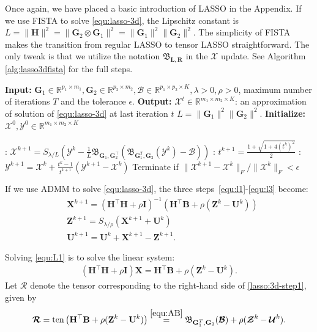 \documentclass[10pt]{article}  	%
\theoremstyle{definition}
\theoremstyle{definition}
\newcommand{\R}{{\mathbb{R}}}
\newcommand{\Bc}{\boldsymbol{{\mathcal{B}}}}
\newcommand{\Xc}{ \boldsymbol{{\mathcal{X}}}}
\newcommand{\Yc}{\boldsymbol{{\mathcal{Y}}}}
\DeclareMathOperator*{\mat}{{\rm{mat}}}
\DeclareMathOperator*{\ten}{{\rm{ten}}}
\newcommand{\mB}{\mathbf{B}}
\newcommand{\mG}{\mathbf{G}}
\newcommand{\mH}{\mathbf{H}}
\newcommand{\mI}{\mathbf{I}}
\newcommand{\mL}{\mathbf{L}}
\newcommand{\mR}{\mathbf{R}}
\newcommand{\mU}{\mathbf{U}}
\newcommand{\mX}{\mathbf{X}}
\newcommand{\mZ}{\mathbf{Z}}
\theoremstyle{remark}
\begin{document}
Once again, we have placed a basic introduction of LASSO in the Appendix.
If we use FISTA to solve \eqref{equ:lasso-3d}, the Lipschitz constant is   $L=\|\mH\|^2=\|\mG_2 \otimes \mG_1\|^2=\|\mG_1\|^2\|\mG_2\|^2$. The simplicity of FISTA makes the transition from regular LASSO to tensor LASSO straightforward. The only tweak is that we utilize the notation $\mathfrak{B}_{\mL, \mR}$ in the $\Xc$ update.
See Algorithm \ref{alg:lasso3dfista} for the full steps.
\begin{algorithm}[htb]
\caption{LASSO($\mG_1, \mG_2, \Bc, \lambda; T, \epsilon$): FISTA}\label{alg:lasso3dfista}
\begin{algorithmic}
\State\textbf{Input:} $\mG_1 \in \R^{p_1 \times m_1}, \mG_2 \in \R^{p_2 \times m_2}, \Bc\in\R^{p_1 \times p_2\times K}, \lambda >0, \rho>0$, maximum number of iterations $T$ and the tolerance $\epsilon$.
\State\textbf{Output:} $\Xc^{t}\in\R^{m_1 \times m_2\times K}$: an approximation of solution of \eqref{equ:lasso-3d} at last iteration $t$
\State $L=\|\mG_1\|^2\|\mG_2\|^2$.
\State\textbf{Initialize:} $\Xc^0, \Yc^0 \in \R^{m_1\times m_2 \times K}$ 

: $\Xc^{k+1} = S_{\lambda/L}\!\left(\Yc^k-\tfrac{1}{L}\mathfrak{B}_{\mG_1, \mG_2^\top}\left(\mathfrak{B}_{\mG_1^T, \mG_2}(\Yc^k)-\Bc\right)\right)$ 
 : $t^{k+1} = \frac{1 + \sqrt{1 + 4(t^k)^2}}{2}$
 : $\Yc^{k+1} = \Xc^{k} + \frac{t^k - 1}{t^{k+1}}(\Yc^{k+1} - \Xc^k)$
\State Terminate if $\|\Xc^{k+1}-\Xc^k\|_F/\|\Xc^k\|_F <\epsilon$ 
\EndFor
\end{algorithmic}
\end{algorithm}

If we use ADMM to solve \eqref{equ:lasso-3d}, the three steps~\eqref{equ:l1}-\eqref{equ:l3} become:
\begin{align}\label{equ:L1}
&\mX^{k+1} = (\mH^\top \mH + \rho \mI)^{-1}(\mH^\top \mB + \rho (\mZ^k - \mU^k))\\
&\mZ^{k+1} = S_{\lambda/\rho}(\mX^{k+1} + \mU^k)\\
&\mU^{k+1} = \mU^k + \mX^{k+1} - \mZ^{k+1}.
\end{align}

Solving \eqref{equ:L1} is to solve the linear system:
\begin{align}\label{lasso:3d-step1}
(\mH^\top \mH + \rho \mI)\mX = \mH^\top \mB + \rho(\mZ^k - \mU^k).
\end{align}
Let $\boldsymbol{\mathcal{R}}$ denote the tensor corresponding to the right-hand side of \eqref{lasso:3d-step1}, given by
\[
\boldsymbol{\mathcal{R}}= \ten\left(\mH^\top \mB + \rho(\mZ^k - \mU^k)\right)\stackrel{\eqref{equ:AB}}{=} \mathfrak{B}_{\mG_1^T, \mG_2}(\Bc)+ \rho(\boldsymbol{\mathcal{Z}}^k - \boldsymbol{\mathcal{U}}^k).
\]
\end{document}
